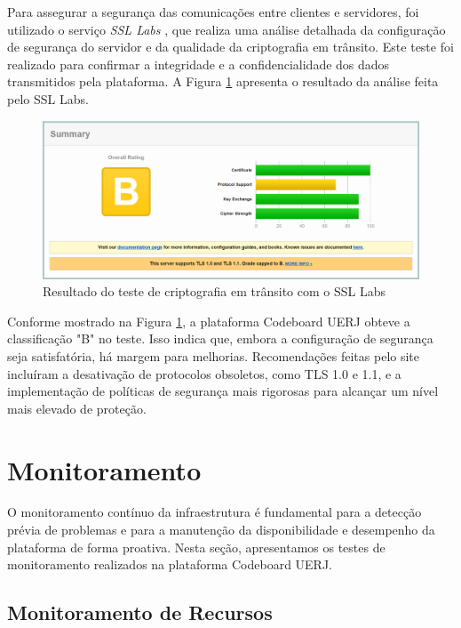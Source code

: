 Para assegurar a segurança das comunicações entre clientes e servidores, foi utilizado o serviço \emph{SSL Labs} \cite{ssl-labs}, que realiza uma análise detalhada da configuração de segurança do servidor e da qualidade da criptografia em trânsito. Este teste foi realizado para confirmar a integridade e a confidencialidade dos dados transmitidos pela plataforma. A Figura \ref{fig:ssl-labs} apresenta o resultado da análise feita pelo SSL Labs.

\begin{figure}[H]
    \centering
    \includegraphics[width=1\textwidth]{assets/security-test/ssl-labs.png}
    \caption{Resultado do teste de criptografia em trânsito com o SSL Labs}
    \label{fig:ssl-labs}
\end{figure}

Conforme mostrado na Figura \ref{fig:ssl-labs}, a plataforma Codeboard UERJ obteve a classificação "B" no teste. Isso indica que, embora a configuração de segurança seja satisfatória, há margem para melhorias. Recomendações feitas pelo site incluíram a desativação de protocolos obsoletos, como TLS 1.0 e 1.1, e a implementação de políticas de segurança mais rigorosas para alcançar um nível mais elevado de proteção.


\section{Monitoramento}

O monitoramento contínuo da infraestrutura é fundamental para a detecção prévia de problemas e para a manutenção da disponibilidade e desempenho da plataforma de forma proativa. Nesta seção, apresentamos os testes de monitoramento realizados na plataforma Codeboard UERJ.

\subsection{Monitoramento de Recursos}

